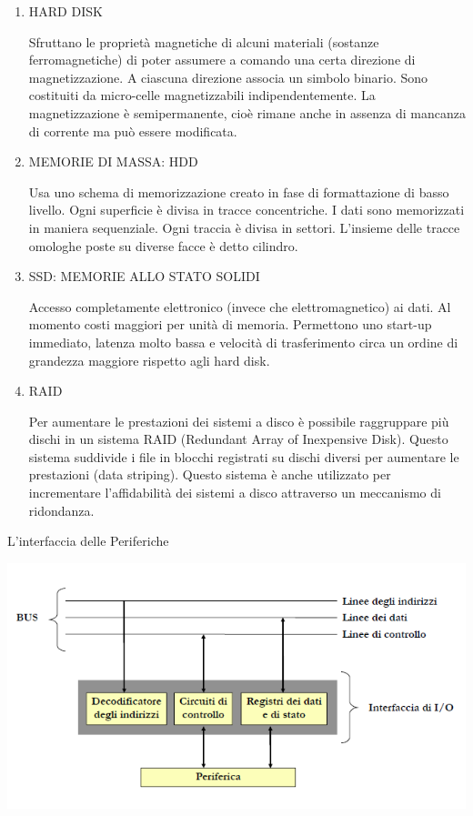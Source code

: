 \documentclass[
  paper=a4,
  oneside  ,captions=tableheading
]{scrbook}
\begin{document}
\begin{enumerate}
\def\labelenumi{\arabic{enumi}.}
\item
  HARD DISK

  Sfruttano le proprietà magnetiche di alcuni materiali (sostanze
  ferromagnetiche) di poter assumere a comando una certa direzione di
  magnetizzazione. A ciascuna direzione associa un simbolo binario. Sono
  costituiti da micro-celle magnetizzabili indipendentemente. La
  magnetizzazione è semipermanente, cioè rimane anche in assenza di
  mancanza di corrente ma può essere modificata.
\item
  MEMORIE DI MASSA: HDD

  Usa uno schema di memorizzazione creato in fase di formattazione di
  basso livello. Ogni superficie è divisa in tracce concentriche. I dati
  sono memorizzati in maniera sequenziale. Ogni traccia è divisa in
  settori. L'insieme delle tracce omologhe poste su diverse facce è
  detto cilindro.
\item
  SSD: MEMORIE ALLO STATO SOLIDI

  Accesso completamente elettronico (invece che elettromagnetico) ai
  dati. Al momento costi maggiori per unità di memoria. Permettono uno
  start-up immediato, latenza molto bassa e velocità di trasferimento
  circa un ordine di grandezza maggiore rispetto agli hard disk.
\item
  RAID

  Per aumentare le prestazioni dei sistemi a disco è possibile
  raggruppare più dischi in un sistema RAID (Redundant Array of
  Inexpensive Disk). Questo sistema suddivide i file in blocchi
  registrati su dischi diversi per aumentare le prestazioni (data
  striping). Questo sistema è anche utilizzato per incrementare
  l'affidabilità dei sistemi a disco attraverso un meccanismo di
  ridondanza.
\end{enumerate}

L'interfaccia delle Periferiche

\includegraphics{./image/image-20201112230056001.png}
\end{document}
